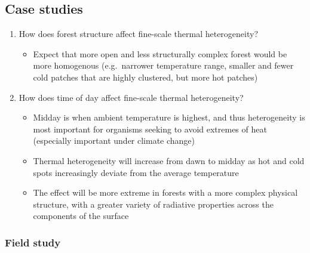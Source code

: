 \documentclass[12pt,a4paper,]{report}
\providecommand{\tightlist}{%
  \setlength{\itemsep}{0pt}\setlength{\parskip}{0pt}}
\theoremstyle{definition}
\theoremstyle{definition}
\theoremstyle{definition}
\theoremstyle{remark}
\begin{document}
\subsection{Case studies}\label{case-studies}

\begin{enumerate}
\def\labelenumi{\arabic{enumi}.}
\tightlist
\item
  How does forest structure affect fine-scale thermal heterogeneity?

  \begin{itemize}
  \tightlist
  \item
    Expect that more open and less structurally complex forest would be
    more homogenous (e.g.~narrower temperature range, smaller and fewer
    cold patches that are highly clustered, but more hot patches)
  \end{itemize}
\item
  How does time of day affect fine-scale thermal heterogeneity?

  \begin{itemize}
  \tightlist
  \item
    Midday is when ambient temperature is highest, and thus
    heterogeneity is most important for organisms seeking to avoid
    extremes of heat (especially important under climate change)
  \item
    Thermal heterogeneity will increase from dawn to midday as hot and
    cold spots increasingly deviate from the average temperature
  \item
    The effect will be more extreme in forests with a more complex
    physical structure, with a greater variety of radiative properties
    across the components of the surface
  \end{itemize}
\end{enumerate}

\subsubsection{Field study}\label{field-study}
\end{document}
